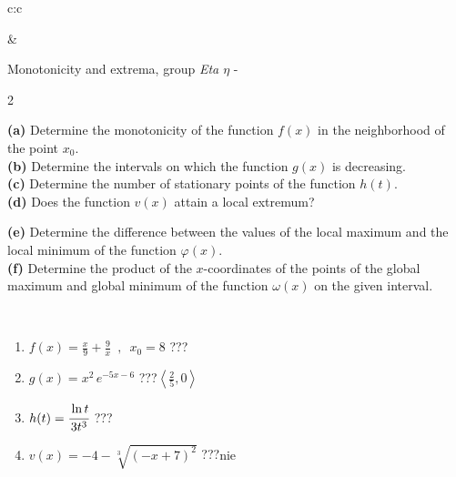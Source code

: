 \documentclass[10pt]{report}
\begin{document}
\begin{tabular}{c:c}
\begin{minipage}[c][104.5mm][t]{0.5\linewidth}
\begin{center}
\begin{minipage}{0.20\linewidth}
\end{minipage}
\end{center}
\end{minipage}
&
\begin{minipage}[c][104.5mm][t]{0.5\linewidth}
\begin{center}
\vspace{5mm}
{\huge Monotonicity and extrema, group \textit{Eta $\eta$} -}\\[5mm]
\begin{minipage}{0.95\linewidth}
\begin{center}
{\small \begin{multicols}{2} \raggedright
\textbf{(a)} Determine the monotonicity of the function \(f(x)\) in the neighborhood of the point \(x_0\). \\[1mm]
\textbf{(b)} Determine the intervals on which the function \(g(x)\) is decreasing. \\[1mm]
\textbf{(c)} Determine the number of stationary points of the function \(h(t)\). \\[1mm]
\textbf{(d)} Does the function \(v(x)\) attain a local extremum? \par \columnbreak
\textbf{(e)} Determine the difference between the values of the local maximum and the local minimum of the function \(\varphi(x)\). \\[1mm]
\textbf{(f)} Determine the product of the \(x\)-coordinates of the points of the global maximum and global minimum of the function \(\omega(x)\) on the given interval. \\[1mm]
\end{multicols}
}
\end{center}
\end{minipage}
\\[1mm]
\begin{minipage}{0.79\linewidth}
\begin{center}
\begin{varwidth}{\linewidth}
\setlength{\itemsep}{0pt}
\begin{enumerate}
\normalsize
\item $f(x)=\frac{x}{9}+\frac{9}{x} \enspace , \enspace x_0=8$\quad \dotfill\; ???\;\dotfill \quad {}
\item $g(x)=x^2\, e^{-5x-6}$\quad \dotfill\; ???\;\dotfill \quad $\left\langle\frac{2}{5} , 0\right\rangle$
\item $h(t)=\cfrac{\ln t}{3t^3}$\quad \dotfill\; ???\;\dotfill {}
\item $v(x)=-4-\sqrt[3]{(-x+7)^2}$\quad \dotfill\; ???\;\dotfill \quad $\text{nie}$

\end{enumerate}
\end{varwidth}
\end{center}
\end{minipage}
\end{center}
\end{minipage}
\end{tabular}
\end{document}
